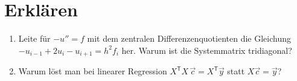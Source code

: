 \documentclass[a4paper,11pt]{article}
\newcommand{\transp}{^{\mathsf{T}}}
\newcommand{\antwort}[1]{\par\vspace{#1}}
\begin{document}
\section*{Erklären}
\begin{enumerate}[label=\arabic*.,leftmargin=*,resume]
  \item Leite für $-u''=f$ mit dem zentralen Differenzenquotienten die Gleichung
        $-u_{i-1}+2u_i-u_{i+1}=h^2 f_i$ her. Warum ist die Systemmatrix tridiagonal?
  \item Warum löst man bei linearer Regression $X\transp X\,\vec c=X\transp\vec y$
        statt $X\vec c=\vec y$?
\end{enumerate}
\antwort{4cm}
\end{document}
